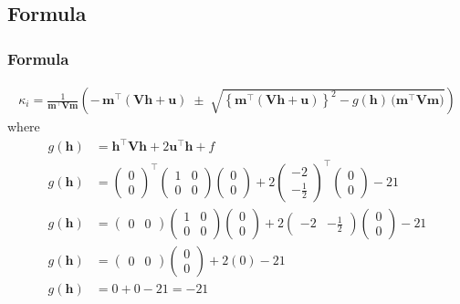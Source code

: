 \documentclass{beamer}
\providecommand{\brak}[1]{\ensuremath{\left(#1\right)}}
\providecommand{\cbrak}[1]{\ensuremath{\left\{#1\right\}}}
\theoremstyle{remark}
\newcommand{\myvec}[1]{\ensuremath{\begin{pmatrix}#1\end{pmatrix}}}
\let\vec\mathbf
\numberwithin{equation}{section}
\begin{document}
 \subsection{Formula}
\begin{frame}
\frametitle{Formula}
\begin{align}
\kappa_i= \frac{1}{\vec{m}^\top \vec{V}\vec{m}}\brak{
       -\,\vec{m}^\top\brak{\vec{V}\vec{h}+\vec{u}}
       \;\pm\;
       \sqrt{ \cbrak{\vec{m}^\top(\vec{V}\vec{h}+\vec{u})}^2
       - g(\vec{h})\,\big(\vec{m}^\top \vec{V}\vec{m}\big)}
     }
\end{align}
where
\begin{align}
g\brak{\vec{h}} &= \vec{h}^\top\vec{V}\vec{h}+2\vec{u}^\top\vec{h}+f \\
g\brak{\vec{h}} &= \myvec{0\\0}^\top\myvec{1&0\\0&0}\myvec{0\\0}+2\myvec{-2\\-\frac{1}{2}}^\top\myvec{0\\0}-21 \\
g\brak{\vec{h}} &= \myvec{0&0}\myvec{1&0\\0&0}\myvec{0\\0}+2\myvec{-2&-\frac{1}{2}}\myvec{0\\0}-21 \\
g\brak{\vec{h}} &= \myvec{0&0}\myvec{0\\0}+2\brak{0}-21 \\
g\brak{\vec{h}} &= 0+0-21=-21
\end{align}
 \end{frame}
\end{document}
